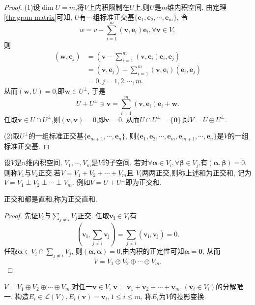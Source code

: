 \begin{proof}
  (1)设$\dim U=m$,将$V$上内积限制在$U$上,则$U$是$m$维内积空间,
  由定理\ref{thr:gram-matrix}可知, $U$有一组标准正交基$\{\bm{e}_1,\bm{e}_2,\cdots,\bm{e}_m\}$,
  令
  \[
  w=v-\sum_{i=1}^m(\bm{v},\bm{e}_i)\bm{e}_i, \forall \bm{v}\in V,
  \]
  则
  \begin{align*}
    (\bm{w},\bm{e}_j) & = (\bm{v}-\sum_{i=1}^m(\bm{v},\bm{e}_i)\bm{e}_i,\bm{e}_j)\\
    & = (\bm{v},\bm{e}_j)-\sum_{i=1}^m(\bm{v},\bm{e}_i)(\bm{e}_i,\bm{e}_j)\\
    & = 0, j=1,2,\cdots,m.
  \end{align*}
  从而$(\bm{w},U)=0$,即$\bm{w}\in U^{\perp}$,
  于是
  \[
  U+U^{\perp}\ni \bm{v}=\sum_{i=1}^m(\bm{v},\bm{e}_i)\bm{e}_i+\bm{w}.
  \] 
  任取$\bm{v}\in U\cap U^{\perp}$,则$(\bm{v},\bm{v})=0$,即$\bm{v}=0$,
  从而$U\cap U^{\perp}=\{\bm{0}\}$,即$V=U\oplus U^{\perp}$.

  (2)取$U^{\perp}$的一组标准正交基$\{\bm{e}_{m+1},\cdots,\bm{e}_n\}$,
  则$\{\bm{e}_1,\bm{e}_2,\cdots,\bm{e}_m,\bm{e}_{m+1},\cdots,\bm{e}_n\}$是$V$的一组标准正交基.
\end{proof}

\begin{definition}
  设$V$是$n$维内积空间, $V_1,\cdots,V_m$是$V$的子空间,
  若对$\forall \bm{\alpha}\in V_i,\forall \bm{\beta}\in V_j$,有$(\bm{\alpha},\bm{\beta})=0$, 
  则称$V_1$与$V_2$正交.若$V=V_1+V_2+\cdots+V_m$且
  $V_i$两两正交,则称上述和为正交和,
  记为$V=V_1\perp V_2\perp\cdots\perp V_m$.
  例如$V=U+U^{\perp}$即为正交和.
\end{definition}

\begin{theory}
  正交和都是直和,称为正交直和.
\end{theory}

\begin{proof}
  先证$V_i$与$\sum\limits_{j\neq i}V_j$正交.
  任取$\bm{v_i} \in V_i$有
  \[
  (\bm{v_i},\sum_{j\neq i}\bm{v_j}) = \sum_{j\neq i}(\bm{v_i},\bm{v_j}) = 0.
  \]
  任取$\bm{\alpha}\in V_i\cap\sum\limits_{j\neq i}V_j$,
  则$(\bm{\alpha},\bm{\alpha})=0$,由内积的正定性可知$\bm{\alpha}=\bm{0}$,
  从而
  \[
  V=V_1\oplus V_2\oplus\cdots\oplus V_m.
  \]
\end{proof}

\begin{definition}
$V=V_1\oplus V_2\oplus\cdots\oplus V_m$,对任一$\bm{v}\in V$,
$\bm{v}=\bm{v}_1+\bm{v}_2+\cdots+\bm{v}_m, (\bm{v}_i\in V_i)$的分解唯一.
构造$E_i \in \mathscr{L}(V), E_i(\bm{v})=\bm{v}_i, 1 \leq i \leq m$,
称$E_i$为$V$的{\heiti 投影变换}.
\end{definition}

